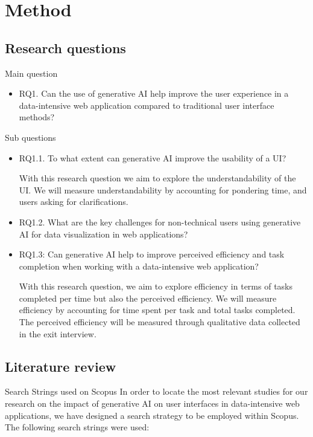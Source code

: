 \chapter{Method}
\label{chp:method}

\section{Research questions}
Main question
\begin{itemize}
    \item RQ1. Can the use of generative AI help improve the user experience in a data-intensive web application compared to traditional user interface methods?
\end{itemize}

Sub questions
\begin{itemize}
    \item RQ1.1. To what extent can generative AI improve the usability of a UI?

    With this research question we aim to explore the understandability of the UI. We will measure understandability by accounting for pondering time, and users asking for clarifications.

    \item RQ1.2. What are the key challenges for non-technical users using generative AI for data visualization in web applications?

    \item RQ1.3: Can generative AI help to improve perceived efficiency and task completion when working with a data-intensive web application?

    With this research question, we aim to explore efficiency in terms of tasks completed per time but also the perceived efficiency. We will measure efficiency by accounting for time spent per task and total tasks completed. The perceived efficiency will be measured through qualitative data collected in the exit interview.
    
\end{itemize}

\section{Literature review}
Search Strings used on Scopus
In order to locate the most relevant studies for our research on the impact of generative AI on user interfaces in data-intensive web applications, we have designed a search strategy to be employed within Scopus. The following search strings were used:

